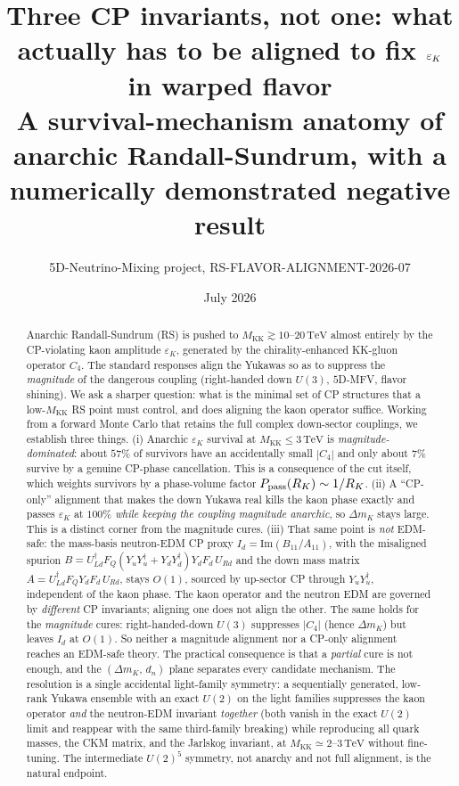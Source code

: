\documentclass[11pt]{article}
\title{\bf Three CP invariants, not one: what actually has to be aligned to
fix $\epsK$ in warped flavor\\[4pt]
\large A survival-mechanism anatomy of anarchic Randall-Sundrum, with a
numerically demonstrated negative result}
\author{5D-Neutrino-Mixing project, RS-FLAVOR-ALIGNMENT-2026-07}
\date{July 2026}
\newcommand{\MKK}{M_{\mathrm{KK}}}
\newcommand{\epsK}{\varepsilon_K}
\newcommand{\dmK}{\Delta m_K}
\newcommand{\TeV}{\,\mathrm{TeV}}
\begin{document}
\maketitle

\begin{abstract}
\noindent
Anarchic Randall-Sundrum (RS) is pushed to $\MKK\gtrsim 10$--$20\TeV$ almost
entirely by the CP-violating kaon amplitude $\epsK$, generated by the
chirality-enhanced KK-gluon operator $C_4$. The standard responses align the
Yukawas so as to suppress the \emph{magnitude} of the dangerous coupling
(right-handed down $U(3)$, $5$D-MFV, flavor shining). We ask a sharper question:
what is the minimal set of CP structures that a low-$\MKK$ RS point must control,
and does aligning the kaon operator suffice. Working from a forward Monte Carlo
that retains the full complex down-sector couplings, we establish three things.
(i) Anarchic $\epsK$ survival at $\MKK\le3\TeV$ is \emph{magnitude-dominated}:
about $57\%$ of survivors have an accidentally small $|C_4|$ and only about $7\%$
survive by a genuine CP-phase cancellation. This is a consequence of the cut
itself, which weights survivors by a phase-volume factor $P_{\rm pass}(R_K)\sim
1/R_K$. (ii) A ``CP-only'' alignment that makes the down Yukawa real kills the
kaon phase exactly and passes $\epsK$ at $100\%$ \emph{while keeping the coupling
magnitude anarchic}, so $\dmK$ stays large. This is a distinct corner from the
magnitude cures. (iii) That same point is \emph{not} EDM-safe: the mass-basis neutron-EDM CP
proxy $I_d=\mathrm{Im}(B_{11}/A_{11})$, with the misaligned spurion
$B=U_{Ld}^\dagger F_Q(Y_uY_u^\dagger+Y_dY_d^\dagger)Y_dF_d\,U_{Rd}$ and the down mass
matrix $A=U_{Ld}^\dagger F_Q Y_d F_d\,U_{Rd}$, stays $O(1)$, sourced by up-sector CP
through $Y_uY_u^\dagger$, independent of the kaon phase. The kaon operator and the
neutron EDM are governed by \emph{different} CP invariants; aligning one does not
align the other. The same holds for the \emph{magnitude} cures: right-handed-down
$U(3)$ suppresses $|C_4|$ (hence $\dmK$) but leaves $I_d$ at $O(1)$. So neither a
magnitude alignment nor a CP-only alignment reaches an EDM-safe theory. The practical consequence is
that a \emph{partial} cure is not enough, and the $(\dmK,\,d_n)$ plane separates every
candidate mechanism. The resolution is a single accidental light-family symmetry: a
sequentially generated, low-rank Yukawa ensemble with an exact $U(2)$ on the light
families suppresses the kaon operator \emph{and} the neutron-EDM invariant
\emph{together} (both vanish in the exact $U(2)$ limit and reappear with the same
third-family breaking) while reproducing all quark masses, the CKM matrix, and the
Jarlskog invariant, at $\MKK\simeq2$--$3\TeV$ without fine-tuning. The intermediate
$U(2)^5$ symmetry, not anarchy and not full alignment, is the natural endpoint.
\end{abstract}
\end{document}
